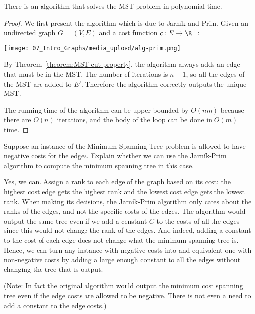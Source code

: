 \begin{flex}
\begin{theorem} \label{theorem:Jarnik-Prim-algorithm-for-MST}
There is an algorithm that solves the MST problem in polynomial time.
\end{theorem}

\begin{proof}
We first present the algorithm which is due to Jarn\'{i}k and Prim. Given an undirected graph $G=(V,E)$ and a cost function $c : E \to \R^+$:

\begin{center}
    \texttt{[image: 07\_Intro\_Graphs/media\_upload/alg-prim.png]}
\end{center}

By Theorem~\ref{theorem:MST-cut-property}, the algorithm always adds an edge that must be in the MST. The number of iterations is $n-1$, so all the edges of the MST are added to $E'$. Therefore the algorithm correctly outputs the unique MST. 

The running time of the algorithm can be upper bounded by $O(nm)$ because there are $O(n)$ iterations, and the body of the loop can be done in $O(m)$ time.
\end{proof}
\end{flex}


\begin{flex}
\begin{exercise}  \label{exercise:MST-with-negative-costs}
Suppose an instance of the Minimum Spanning Tree problem is allowed to have negative costs for the edges. Explain whether we can use the Jarn\'{i}k-Prim algorithm to compute the minimum spanning tree in this case.
\end{exercise}

\begin{solution}
Yes, we can. Assign a rank to each edge of the graph based on its cost: the highest cost edge gets the highest rank and the lowest cost edge gets the lowest rank. When making its decisions, the Jarn\'{i}k-Prim algorithm only cares about the ranks of the edges, and not the specific costs of the edges. The algorithm would output the same tree even if we add a constant $C$ to the costs of all the edges since this would not change the rank of the edges. And indeed, adding a constant to the cost of each edge does not change what the minimum spanning tree is. Hence, we can turn any instance with negative costs into and equivalent one with non-negative costs by adding a large enough constant to all the edges without changing the tree that is output.

\noindent
(Note: In fact the original algorithm would output the minimum cost spanning tree even if the edge costs are allowed to be negative. There is not even a need to add a constant to the edge costs.)
\end{solution}
\end{flex}


